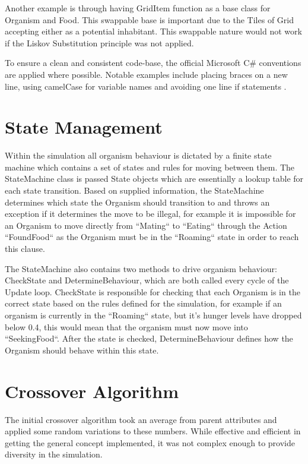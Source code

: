 \documentclass[a4paper, oneside, 11pt]{report}
\begin{document}
Another example is through having GridItem function as a base class for Organism and Food. This swappable base is important due to the Tiles of Grid accepting either as a potential inhabitant. This swappable nature would not work if the Liskov Substitution principle was not applied.

To ensure a clean and consistent code-base, the official Microsoft C\# conventions are applied where possible. Notable examples include placing braces on a new line, using camelCase for variable names and avoiding one line if statements \cite{microsoft}.

\section{State Management}\label{statemanagement}
Within the simulation all organism behaviour is dictated by a finite state machine which contains a set of states and rules for moving between them. The StateMachine class is passed State objects which are essentially a lookup table for each state transition. Based on supplied information, the StateMachine determines which state the Organism should transition to and throws an exception if it determines the move to be illegal, for example it is impossible for an Organism to move directly from ``Mating`` to ``Eating`` through the Action ``FoundFood`` as the Organism must be in the ``Roaming`` state in order to reach this clause.

The StateMachine also contains two methods to drive organism behaviour: CheckState and DetermineBehaviour, which are both called every cycle of the Update loop. CheckState is responsible for checking that each Organism is in the correct state based on the rules defined for the simulation, for example if an organism is currently in the ``Roaming`` state, but it's hunger levels have dropped below 0.4, this would mean that the organism must now move into ``SeekingFood``. After the state is checked, DetermineBehaviour defines how the Organism should behave within this state.

\section{Crossover Algorithm}\label{crossover}
The initial crossover algorithm took an average from parent attributes and applied some random variations to these numbers. While effective and efficient in getting the general concept implemented, it was not complex enough to provide diversity in the simulation.
\end{document}
